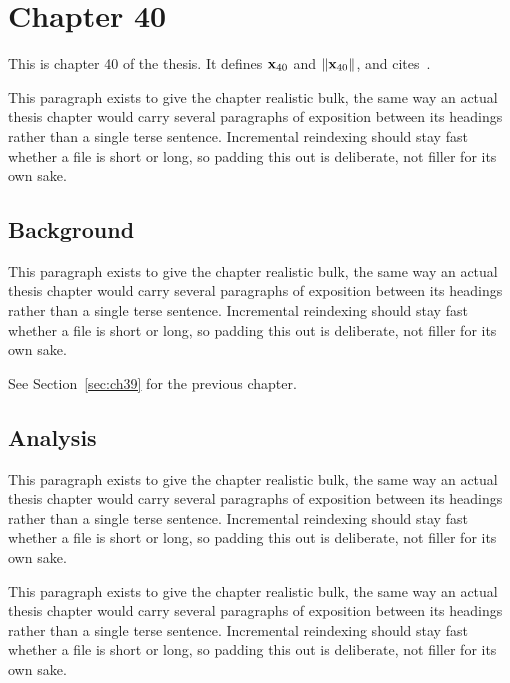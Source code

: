\section{Chapter 40}
\label{sec:ch40}

This is chapter 40 of the thesis. It defines $\mathbf{x}_{40}$ and $\lVert \mathbf{x}_{40} \rVert$, and cites~\cite{ref1}.

This paragraph exists to give the chapter realistic bulk, the same way an actual thesis chapter would carry several paragraphs of exposition between its headings rather than a single terse sentence. Incremental reindexing should stay fast whether a file is short or long, so padding this out is deliberate, not filler for its own sake.

\subsection{Background}
\label{sec:ch40:background}

This paragraph exists to give the chapter realistic bulk, the same way an actual thesis chapter would carry several paragraphs of exposition between its headings rather than a single terse sentence. Incremental reindexing should stay fast whether a file is short or long, so padding this out is deliberate, not filler for its own sake.

See Section~\ref{sec:ch39} for the previous chapter.

\subsection{Analysis}
\label{sec:ch40:analysis}

This paragraph exists to give the chapter realistic bulk, the same way an actual thesis chapter would carry several paragraphs of exposition between its headings rather than a single terse sentence. Incremental reindexing should stay fast whether a file is short or long, so padding this out is deliberate, not filler for its own sake.

This paragraph exists to give the chapter realistic bulk, the same way an actual thesis chapter would carry several paragraphs of exposition between its headings rather than a single terse sentence. Incremental reindexing should stay fast whether a file is short or long, so padding this out is deliberate, not filler for its own sake.
